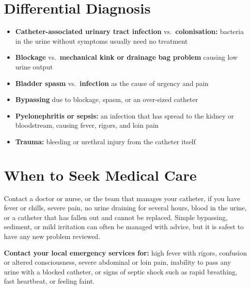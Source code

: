\section*{Differential Diagnosis}
\begin{itemize}
    \item \textbf{Catheter-associated urinary tract infection} vs.\ \textbf{colonisation:} bacteria in the urine without symptoms usually need no treatment
    \item \textbf{Blockage} vs.\ \textbf{mechanical kink or drainage bag problem} causing low urine output
    \item \textbf{Bladder spasm} vs.\ \textbf{infection} as the cause of urgency and pain
    \item \textbf{Bypassing} due to blockage, spasm, or an over-sized catheter
    \item \textbf{Pyelonephritis or sepsis:} an infection that has spread to the kidney or bloodstream, causing fever, rigors, and loin pain
    \item \textbf{Trauma:} bleeding or urethral injury from the catheter itself
\end{itemize}

\section*{When to Seek Medical Care}
Contact a doctor or nurse, or the team that manages your catheter, if you have fever or chills, severe pain, no urine draining for several hours, blood in the urine, or a catheter that has fallen out and cannot be replaced. Simple bypassing, sediment, or mild irritation can often be managed with advice, but it is safest to have any new problem reviewed.

\textbf{Contact your local emergency services for:} high fever with rigors, confusion or altered consciousness, severe abdominal or loin pain, inability to pass any urine with a blocked catheter, or signs of septic shock such as rapid breathing, fast heartbeat, or feeling faint.

